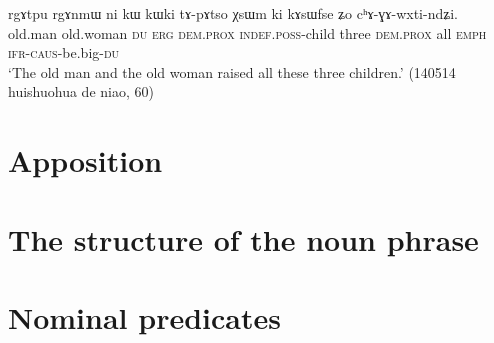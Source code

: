 \begin{exe}
\ex \label{ex:rgAtpu.rgAnmW}
 \gll rgɤtpu rgɤnmɯ ni kɯ kɯki tɤ-pɤtso χsɯm ki kɤsɯfse ʑo cʰɤ-ɣɤ-wxti-ndʑi. \\
 old.man old.woman \textsc{du} \textsc{erg} \textsc{dem}.\textsc{prox} \textsc{indef}.\textsc{poss}-child three \textsc{dem.prox} all \textsc{emph} \textsc{ifr}-\textsc{caus}-be.big-\textsc{du} \\
\glt `The old man and the old woman raised all these three children.' (140514 huishuohua de niao, 60)
\end{exe}

\section{Apposition}

\section{The structure of the noun phrase}


\section{Nominal predicates}
